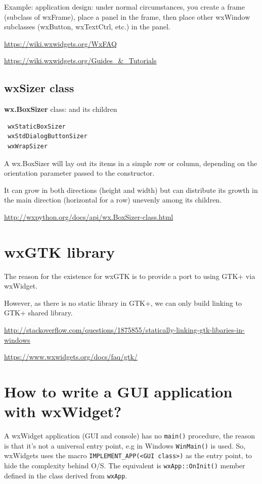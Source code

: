 Example: application design: under normal circumstances, you create a frame (subclass of wxFrame),
place a panel in the frame, then place other wxWindow subclasses (wxButton,
wxTextCtrl, etc.) in the panel.



\url{https://wiki.wxwidgets.org/WxFAQ}

\url{https://wiki.wxwidgets.org/Guides_&_Tutorials}


\subsection{wxSizer class}

{\bf wx.BoxSizer} class: and its children
\begin{verbatim}
 wxStaticBoxSizer
 wxStdDialogButtonSizer
 wxWrapSizer
\end{verbatim}

A wx.BoxSizer will lay out its items in a simple row or column, depending on the
orientation parameter passed to the constructor.

It can grow in both directions (height and width) but can distribute its growth
in the main direction (horizontal for a row) unevenly among its children.
 
\url{http://wxpython.org/docs/api/wx.BoxSizer-class.html}




\section{wxGTK library}
\label{sec:wxGTk}

The reason for the existence for wxGTK is to provide a port to using GTK+ via wxWidget. 

However, as there is no static library in GTK+, we can only build linking to GTK+ shared library.

\url{http://stackoverflow.com/questions/1875855/statically-linking-gtk-libaries-in-windows}

\url{https://www.wxwidgets.org/docs/faq/gtk/}

\section{How to write a GUI application with wxWidget?}

A wxWidget application (GUI and console) has no \verb!main()! procedure, 
the reason is that it's not a universal entry point, e.g in Windows \verb!WinMain()! is used.
So, wxWidgets uses the macro \verb!IMPLEMENT_APP(<GUI class>)! as the entry
point, to hide the complexity behind O/S. The equivalent is
\verb!wxApp::OnInit()! member defined in the class derived from \verb!wxApp!.


